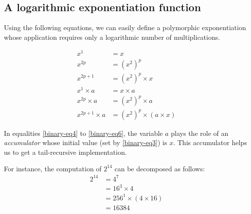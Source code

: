 




\subsection{A logarithmic exponentiation  function}

Using the following equations, we can easily define a polymorphic exponentiation whose application requires only a logarithmic number of multiplications. 

\begin{align}
x^1 &= x \label{binary-eq1}\\
x^{2p} &= (x^2)^p \label{binary-eq2}\\
x^{2p+1} &= (x^2)^p \times x \label{binary-eq3}\\
x^1 \times a &= x \times a \label{binary-eq4}\\
x^{2p} \times a  &= (x^2)^p \times a\label{binary-eq5}\\
x^{2p+1} \times a  &= (x^2)^p \times (a\times x)\label{binary-eq6}
\end{align}


In equalities \ref{binary-eq4} to \ref{binary-eq6}, the variable $a$ plays the role
of an \emph{accumulator} whose initial value (set by \ref{binary-eq3}) is $x$.
This accumulator helps us to get a tail-recursive implementation.

For instance, the computation of $2^{14}$ can be decomposed as follows:
\begin{align*}
2^{14} &= 4^{7} \\
      &= 16^3 \times 4 \\
      &= 256^1 \times (4 \times 16) \\
      &= 16384  
\end{align*}

